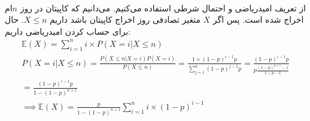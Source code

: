 \\
از تعریف امیدریاضی و احتمال شرطی استفاده می‌کنیم.
می‌دانیم که کاپیتان در روز
$n$ام
اخراج شده است. پس اگر
$X$
متغیر تصادفی روز اخراج کاپیتان باشد داریم
$X \le n$.
حال برای حساب کردن امیدریاضی داریم:
\begin{gather*}
    \mathbb{E}(X) = \sum_{i=1}^{n} i \times P(X = i | X \le n)\\
    P(X = i | X \le n) = \frac{P(X \le n | X = i)P(X = i)}{P(X \le n)} = \frac{1 \times (1-p)^{i-1}p}{\sum_{j=1}^{n} (1-p)^{j-1}p}
    = \frac{(1-p)^{i-1}p}{p \frac{(1-p)^{n+1}-1}{1-p-1}}
    \\= \frac{(1-p)^{i-1}p}{1-(1-p)^{n+1}}\\
    \implies \mathbb{E}(X) = \frac{p}{1-(1-p)^{n+1}} \sum_{i=1}^{n}  i \times (1-p)^{i-1}
\end{gather*}
